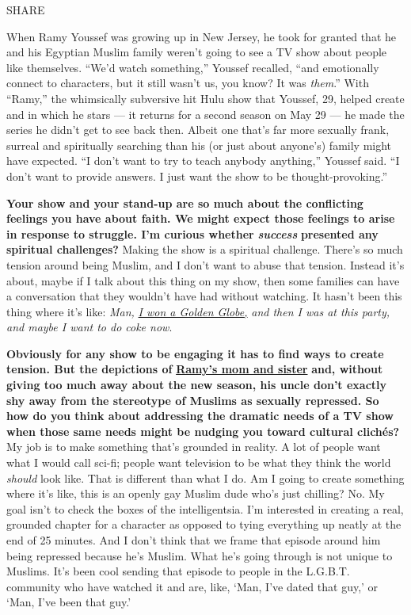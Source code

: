 SHARE

When Ramy Youssef was growing up in New Jersey, he took for granted that
he and his Egyptian Muslim family weren't going to see a TV show about
people like themselves. ``We'd watch something,'' Youssef recalled,
``and emotionally connect to characters, but it still wasn't us, you
know? It was \emph{them}.'' With ``Ramy,'' the whimsically subversive
hit Hulu show that Youssef, 29, helped create and in which he stars ---
it returns for a second season on May 29 --- he made the series he
didn't get to see back then. Albeit one that's far more sexually frank,
surreal and spiritually searching than his (or just about anyone's)
family might have expected. ``I don't want to try to teach anybody
anything,'' Youssef said. ``I don't want to provide answers. I just want
the show to be thought-provoking.''

\textbf{Your show and your stand-up are so much about the conflicting
feelings you have about faith. We might expect those feelings to arise
in response to struggle. I'm curious whether} \emph{\textbf{success}}
\textbf{presented any spiritual challenges?} Making the show is a
spiritual challenge. There's so much tension around being Muslim, and I
don't want to abuse that tension. Instead it's about, maybe if I talk
about this thing on my show, then some families can have a conversation
that they wouldn't have had without watching. It hasn't been this thing
where it's like: \emph{Man,}
\emph{\href{http://nytimes3xbfgragh.onion\#tooltip-1}{I won a Golden
Globe,}} \emph{and then I was at this party, and maybe I want to do coke
now}.

\textbf{Obviously for any show to be engaging it has to find ways to
create tension. But the depictions of}
\textbf{\href{http://nytimes3xbfgragh.onion\#tooltip-2}{Ramy's mom and
sister}} \textbf{and, without giving too much away about the new season,
his uncle don't exactly shy away from the stereotype of Muslims as
sexually repressed. So how do you think about addressing the dramatic
needs of a TV show when those same needs might be nudging you toward
cultural clichés?} My job is to make something that's grounded in
reality. A lot of people want what I would call sci-fi; people want
television to be what they think the world \emph{should} look like. That
is different than what I do. Am I going to create something where it's
like, this is an openly gay Muslim dude who's just chilling? No. My goal
isn't to check the boxes of the intelligentsia. I'm interested in
creating a real, grounded chapter for a character as opposed to tying
everything up neatly at the end of 25 minutes. And I don't think that we
frame that episode around him being repressed because he's Muslim. What
he's going through is not unique to Muslims. It's been cool sending that
episode to people in the L.G.B.T. community who have watched it and are,
like, `Man, I've dated that guy,' or `Man, I've been that guy.'

